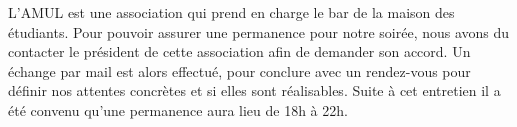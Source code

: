 L'AMUL est une association qui prend en charge le bar de la maison des étudiants.
Pour pouvoir assurer une permanence pour notre soirée, nous avons du contacter 
le président de cette association afin de demander son accord.
Un échange par mail est alors effectué, pour conclure avec un rendez-vous pour 
définir nos attentes concrètes et si elles sont réalisables. Suite à cet entretien 
il a été convenu qu'une permanence aura lieu de 18h à 22h.
